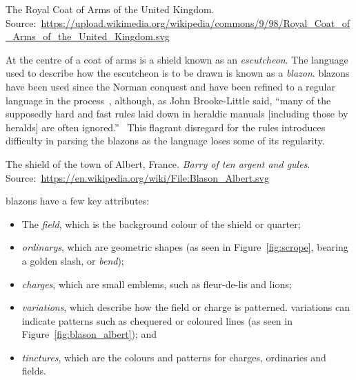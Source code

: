 \documentclass[nobib, a4paper, twoside, justified]{tufte-book}
\makeatletter
\newcommand{\charge}{\gls{charge}\@\xspace}
\newcommand{\charges}{\glspl{charge}\@\xspace}
\newcommand{\quarter}{\gls{quarter}\@\xspace}
\newcommand{\blazon}{\gls{blazon}\@\xspace}
\newcommand{\blazons}{\glspl{blazon}\@\xspace}
\newcommand{\ublazons}{\Glspl{blazon}\@\xspace}
\makeatother
\begin{document}
\begin{marginfigure}
  \centering
  \def\svgwidth{0.8\linewidth}
  
  \caption{The Royal Coat of Arms of the United Kingdom.
  Source:~\url{https://upload.wikimedia.org/wikipedia/commons/9/98/Royal_Coat_of_Arms_of_the_United_Kingdom.svg}}%
  \label{fig:royal_coa}
\end{marginfigure}

At the centre of a coat of arms is a shield known as an \textit{\gls{escutcheon}}. The language
used to describe how the escutcheon is to be drawn is known as a \textit{\blazon}.
\ublazons have been used since the Norman conquest and have been refined to a regular language
in the process~\autocite{boutell_1864}, although, as John Brooke-Little said, ``many of the
supposedly hard and fast rules laid down in heraldic manuals [including those by heralds] are often
ignored.''~\autocite{brooke_little_1985} This flagrant disregard for the rules introduces
difficulty in parsing the \blazons as the language loses some of its regularity.

\begin{marginfigure}
  \centering
  \def\svgwidth{0.8\linewidth}
  
  \caption{The shield of the town of Albert, France. \textit{Barry of ten argent and
  gules}. Source:~\url{https://en.wikipedia.org/wiki/File:Blason_Albert.svg}}\label{fig:blason_albert}
\end{marginfigure}

\ublazons have a few key attributes:
\begin{itemize}
  \item The \textit{\gls{field}}, which is the background colour of the shield or
    \quarter{};
  \item \textit{\Glspl{ordinary}}, which are geometric shapes (as seen in Figure~\ref{fig:scrope},
    bearing a golden slash, or \textit{bend});
  \item \textit{\Glspl{charge}}, which are small emblems, such as fleur-de-lis and lions;
  \item \textit{\Glspl{variation}}, which describe how the field or \charge{} is patterned.
    \Glspl{variation} can indicate patterns such as chequered or coloured lines (as seen in
    Figure~\ref{fig:blason_albert}); and
  \item \textit{\Glspl{tincture}}, which are the colours and patterns for \charges{}, ordinaries
    and fields.
\end{itemize}
\end{document}
